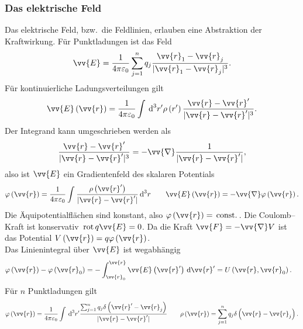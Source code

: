 \documentclass[a4paper,12pt]{article}
\newcommand{\td}{\,\text{d}}
\numberwithin{equation}{section}
\begin{document}
\subsubsection{Das elektrische Feld}
Das elektrische Feld, bzw.\ die Feldlinien, erlauben eine Abstraktion der Kraftwirkung. Für Punktladungen ist das Feld
\begin{align} 
        \vv{E}=\dfrac{1}{4\pi \varepsilon _0}\sum_{j=1}^{n}q_j\dfrac{\vv{r}_1-\vv{r}_j}{|\vv{r}_1-\vv{r}_j|^3}
.\end{align} 
Für kontinuierliche Ladungsverteilungen gilt
\begin{align} 
        \vv{E}\left(\vv{r}\right)=\dfrac{1}{4\pi \varepsilon _0}\int_{}^{}\td ^3r'\rho \left(r'\right)\dfrac{\vv{r}-\vv{r}'}{|\vv{r}-\vv{r}'|^3}
.\end{align} 
Der Integrand kann umgeschrieben werden als 
\begin{align} 
        \dfrac{\vv{r}-\vv{r}'}{|\vv{r}-\vv{r}'|^3}=-\vv{\nabla }\dfrac{1}{|\vv{r}-\vv{r}'|}
,\end{align} 
also ist $\vv{E}$ ein Gradientenfeld des skalaren Potentials
\begin{align} 
        \varphi \left(\vv{r}\right)=\dfrac{1}{4\pi \varepsilon _0}\int_{}^{}\dfrac{\rho \left(\vv{r}'\right)}{|\vv{r}-\vv{r}'|}\td ^3r\qquad \vv{E}\left(\vv{r}\right)=-\vv{\nabla }\varphi \left(\vv{r}\right)
.\end{align} 
Die Äquipotentialflächen sind konstant, also $\varphi \left(\vv{r}\right)=\,\text{const.}\,$. Die Coulomb--Kraft ist konservativ $\,\text{rot}\,q\vv{E}=0$. Da die Kraft $\vv{F}=-\vv{\nabla }V$ ist das Potential $V\left(\vv{r}\right)=q\varphi \left(\vv{r}\right)$.\\\indent
Das Linienintegral über $\vv{E}$ ist wegabhängig
\begin{align} 
        \varphi \left(\vv{r}\right)-\varphi \left(\vv{r}_0\right)&=-\int_{\vv{r}_0}^{\vv{r}}\vv{E}\left(\vv{r}'\right)\td \vv{r}'=U\left(\vv{r},\vv{r}_0\right)
.\end{align} 
Für $n$ Punktladungen gilt 
\begin{align} 
        \varphi \left(\vv{r}\right)=\dfrac{1}{4\pi \varepsilon _0}\int_{}^{}\td ^3r'\dfrac{\sum_{j=1}^{n}q_j\delta \left(\vv{r}'-\vv{r}_j\right)}{|\vv{r}-\vv{r}'|}\qquad \rho \left(\vv{r}\right)=\sum_{j=1}^{n}q_j\delta \left(\vv{r}-\vv{r}_j\right)
.\end{align} 
\end{document}
